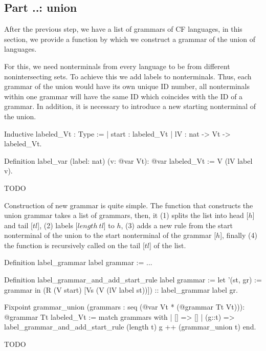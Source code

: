 \subsection{Part ..: union}

After the previous step, we have a list of grammars of CF languages, in this section, we provide a function by which we construct a grammar of the union of languages.

For this, we need nonterminals from every language to be from different nonintersecting sets. To achieve this we add labels to nonterminals. Thus, each grammar of the union would have its own unique ID number, all nonterminals within one grammar will have the same ID which coincides with the ID of a grammar. In addition, it is necessary to introduce a new starting nonterminal of the union.

\begin{listing}[h]
	\begin{pyglist}[language=coq, numbers=none, numbersep=5pt]
  Inductive labeled_Vt : Type :=
  | start : labeled_Vt
  | lV : nat -> Vt -> labeled_Vt.
  
  Definition label_var (label: nat) (v: @var Vt): @var labeled_Vt :=
    V (lV label v).  
	\end{pyglist}
	\caption{TODO}
	\label{lst:verbments1}
\end{listing}

Construction of new grammar is quite simple. The function that constructs the union grammar takes a list of grammars, then, it (1) splits the list into head [$h$] and tail [$tl$], (2) labels [$length \ tl$] to $h$, (3) adds a new rule from the start nonterminal of the union to the start nonterminal of the grammar [$h$], finally (4) the function is recursively called on the tail [$tl$] of the list.

\begin{listing}[h]
	\begin{pyglist}[language=coq, numbers=none, numbersep=5pt]
  Definition label_grammar label grammar := ...

  Definition label_grammar_and_add_start_rule label grammar :=
    let '(st, gr) := grammar in 
    (R (V start) [Vs (V (lV label st))]) :: label_grammar label gr.        

  Fixpoint grammar_union (grammars : seq (@var Vt * (@grammar Tt Vt))): @grammar Tt labeled_Vt :=
    match grammars with
    |  [] => []
    |  (g::t) => label_grammar_and_add_start_rule (length t) g ++ (grammar_union t)
    end.
	\end{pyglist}
	\caption{TODO}
	\label{lst:verbments1}
\end{listing}

